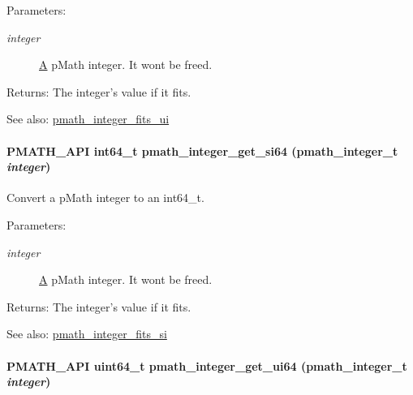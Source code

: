 \begin{Desc}
\item[Parameters:]
\begin{description}
\item[{\em integer}]\hyperlink{class_a}{A} pMath integer. It wont be freed. \end{description}
\end{Desc}
\begin{Desc}
\item[Returns:]The integer's value if it fits.\end{Desc}
\begin{Desc}
\item[See also:]\hyperlink{group__numbers_gb12e5e34b7918cb6beee23c57cdd0d36}{pmath\_\-integer\_\-fits\_\-ui} \end{Desc}
\hypertarget{group__numbers_g95e554207096c722e5be03f538ff7eae}{
\paragraph[{pmath\_\-integer\_\-get\_\-si64}]{\setlength{\rightskip}{0pt plus 5cm}PMATH\_\-API int64\_\-t pmath\_\-integer\_\-get\_\-si64 ({\bf pmath\_\-integer\_\-t} {\em integer})}\hfill}
\label{group__numbers_g95e554207096c722e5be03f538ff7eae}


Convert a pMath integer to an int64\_\-t. 

\begin{Desc}
\item[Parameters:]
\begin{description}
\item[{\em integer}]\hyperlink{class_a}{A} pMath integer. It wont be freed. \end{description}
\end{Desc}
\begin{Desc}
\item[Returns:]The integer's value if it fits.\end{Desc}
\begin{Desc}
\item[See also:]\hyperlink{group__numbers_gc220e06754067b9ba4a7c823017ad32e}{pmath\_\-integer\_\-fits\_\-si} \end{Desc}
\hypertarget{group__numbers_ged9add974a0fd79a3ecfb91e51280e96}{
\paragraph[{pmath\_\-integer\_\-get\_\-ui64}]{\setlength{\rightskip}{0pt plus 5cm}PMATH\_\-API uint64\_\-t pmath\_\-integer\_\-get\_\-ui64 ({\bf pmath\_\-integer\_\-t} {\em integer})}\hfill}
\label{group__numbers_ged9add974a0fd79a3ecfb91e51280e96}


